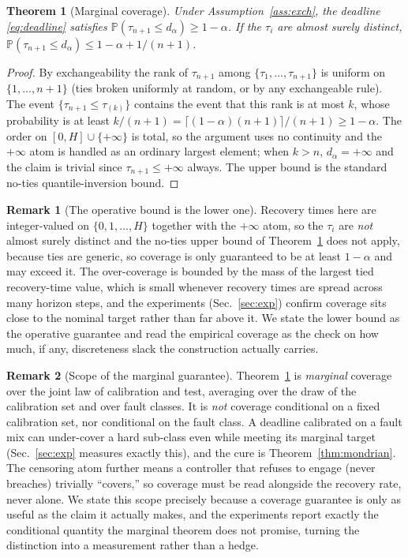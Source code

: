 \documentclass[journal]{IEEEtran}
\theoremstyle{plain}
\newtheorem{theorem}{Theorem}
\theoremstyle{definition}
\newtheorem{remark}{Remark}
\newcommand{\Prob}{\mathbb{P}}
\newcommand{\dalpha}{d_{\alpha}}
\begin{document}
\begin{theorem}[Marginal coverage]
\label{thm:marginal}
Under Assumption~\ref{ass:exch}, the deadline \eqref{eq:deadline} satisfies
$\Prob(\tau_{n+1} \le \dalpha) \ge 1-\alpha$. If the $\tau_i$ are almost surely distinct,
$\Prob(\tau_{n+1}\le\dalpha) \le 1-\alpha + 1/(n+1)$.
\end{theorem}
\begin{proof}
By exchangeability the rank of $\tau_{n+1}$ among $\{\tau_1,\dots,\tau_{n+1}\}$ is uniform
on $\{1,\dots,n+1\}$ (ties broken uniformly at random, or by any exchangeable rule). The
event $\{\tau_{n+1}\le \tau_{(k)}\}$ contains the event that this rank is at most $k$, whose
probability is at least $k/(n+1) = \lceil(1-\alpha)(n+1)\rceil/(n+1) \ge 1-\alpha$. The
order on $[0,H]\cup\{+\infty\}$ is total, so the argument uses no continuity and the
$+\infty$ atom is handled as an ordinary largest element; when $k>n$, $\dalpha=+\infty$ and
the claim is trivial since $\tau_{n+1}\le+\infty$ always. The upper bound is the standard
no-ties quantile-inversion bound.
\end{proof}

\begin{remark}[The operative bound is the lower one]
\label{rem:discrete}
Recovery times here are integer-valued on $\{0,1,\dots,H\}$ together with the $+\infty$ atom,
so the $\tau_i$ are \emph{not} almost surely distinct and the no-ties upper bound of
Theorem~\ref{thm:marginal} does not apply, because ties are generic, so coverage is only
guaranteed to be at least $1-\alpha$ and may exceed it. The over-coverage is bounded by the
mass of the largest tied recovery-time value, which is small whenever recovery times are
spread across many horizon steps, and the experiments (Sec.~\ref{sec:exp}) confirm coverage
sits close to the nominal target rather than far above it. We state the lower bound as the
operative guarantee and read the empirical coverage as the check on how much, if any,
discreteness slack the construction actually carries.
\end{remark}

\begin{remark}[Scope of the marginal guarantee]
\label{rem:marginal}
Theorem~\ref{thm:marginal} is \emph{marginal} coverage over the joint law of calibration
and test, averaging over the draw of the calibration set and over fault classes. It is
\emph{not} coverage conditional on a fixed calibration set, nor conditional on the fault
class. A deadline calibrated on a fault mix can under-cover a hard sub-class even while
meeting its marginal target (Sec.~\ref{sec:exp} measures exactly this), and the cure is
Theorem~\ref{thm:mondrian}. The censoring atom further means a controller that refuses to
engage (never breaches) trivially ``covers,'' so coverage must be read alongside the
recovery rate, never alone. We state this scope precisely because a coverage guarantee is
only as useful as the claim it actually makes, and the experiments report exactly the
conditional quantity the marginal theorem does not promise, turning the distinction into a
measurement rather than a hedge.
\end{remark}
\end{document}
